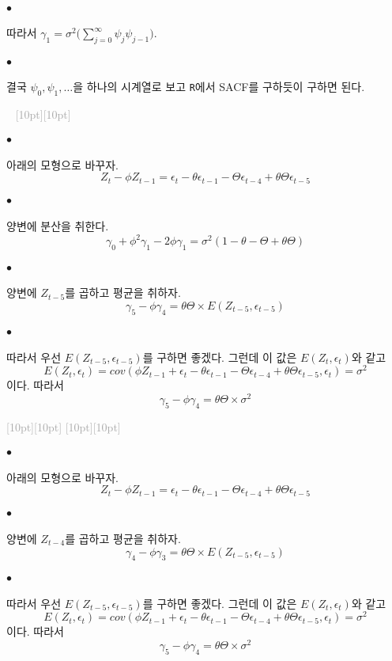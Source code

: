 \documentclass[12pt,oneside,english]{book}
\newcommand{\dash}{\vspace{2em}\noindent \textcolor{darkgray}{\hrulefill~ \raisebox{-2.5pt}[10pt][10pt]{\leafright \decofourleft \decothreeleft  \aldineright \decotwo \floweroneleft \decoone   \floweroneright \decotwo \aldineleft\decothreeright \decofourright \leafleft} ~  \hrulefill \\ \vspace{2em}}}
\newcommand{\rdash}{\noindent \textcolor{darkgray}{ \raisebox{-1.9pt}[10pt][10pt]{\leafright} \hrulefill \raisebox{-1.9pt}[10pt][10pt]{\leafright \decofourleft \decothreeleft  \aldineright \decotwo \floweroneleft \decoone}}}
\def\ck{\paragraph{\Large$\bullet$}\Large}
\begin{document}
\ck 따라서 $\gamma_1=\sigma^2\big(\sum_{j=0}^{\infty}\psi_j\psi_{j-1}\big).$

\ck 결국 $\psi_0,\psi_1,\dots$을 하나의 시계열로 보고 {\tt R}에서 SACF를 구하듯이 구하면 된다. 

\dash 

\ck 아래의 모형으로 바꾸자. 
\[
Z_t-\phi Z_{t-1}=\epsilon_t-\theta \epsilon_{t-1} -\Theta \epsilon_{t-4} +\theta\Theta\epsilon_{t-5}
\]

\ck 양변에 분산을 취한다. 
\[
\gamma_0+\phi^2\gamma_1 -2\phi\gamma_1 =\sigma^2(1-\theta-\Theta+\theta\Theta)
\]


\ck 양변에 $Z_{t-5}$를 곱하고 평균을 취하자. 
\[
\gamma_5-\phi \gamma_4 = \theta \Theta \times E(Z_{t-5},\epsilon_{t-5})
\]

\ck 따라서 우선 $E(Z_{t-5},\epsilon_{t-5})$를 구하면 좋겠다. 그런데 이 값은 $E(Z_{t},\epsilon_{t})$와 같고 
\[
E(Z_t,\epsilon_t)=cov(\phi Z_{t-1}+\epsilon_t-\theta \epsilon_{t-1}-\Theta\epsilon_{t-4}+\theta\Theta\epsilon_{t-5},\epsilon_t)=\sigma^2
\]
이다. 따라서 
\[
\gamma_5-\phi \gamma_4 = \theta \Theta \times \sigma^2
\]

\rdash 

\ck 아래의 모형으로 바꾸자. 
\[
Z_t-\phi Z_{t-1}=\epsilon_t-\theta \epsilon_{t-1} -\Theta \epsilon_{t-4} +\theta\Theta\epsilon_{t-5}
\]

\ck 양변에 $Z_{t-4}$를 곱하고 평균을 취하자. 
\[
\gamma_4-\phi \gamma_3 = \theta \Theta \times E(Z_{t-5},\epsilon_{t-5})
\]

\ck 따라서 우선 $E(Z_{t-5},\epsilon_{t-5})$를 구하면 좋겠다. 그런데 이 값은 $E(Z_{t},\epsilon_{t})$와 같고 
\[
E(Z_t,\epsilon_t)=cov(\phi Z_{t-1}+\epsilon_t-\theta \epsilon_{t-1}-\Theta\epsilon_{t-4}+\theta\Theta\epsilon_{t-5},\epsilon_t)=\sigma^2
\]
이다. 따라서 
\[
\gamma_5-\phi \gamma_4 = \theta \Theta \times \sigma^2
\]
\end{document}
